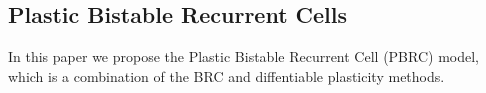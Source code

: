 \subsection*{Plastic Bistable Recurrent Cells}

In this paper we propose the Plastic Bistable Recurrent Cell (PBRC) model, which is a combination of the BRC and diffentiable plasticity methods.